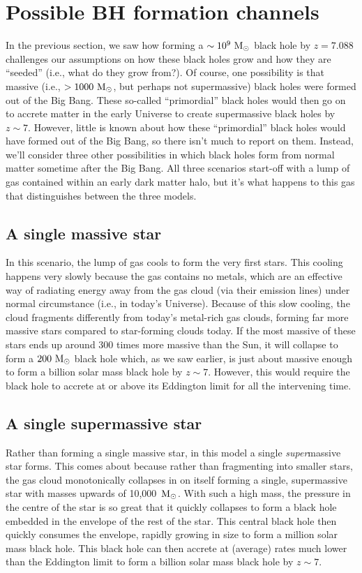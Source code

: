 \documentclass[11pt]{article}
\begin{document}
\section{Possible BH formation channels}
In the previous section, we saw how forming a $\sim10^9~{\rm M_\odot}$
black hole by $z=7.088$ challenges our assumptions on how these black
holes grow and how they are ``seeded'' (i.e., what do they grow
from?). Of course, one possibility is that massive (i.e.,
$>1000~{\rm M_\odot}$, but perhaps not supermassive) black holes were
formed out of the Big Bang. These so-called ``primordial'' black holes
would then go on to accrete matter in the early Universe to create
supermassive black holes by $z\sim7$. However, little is known about
how these ``primordial'' black holes would have formed out of the Big
Bang, so there isn't much to report on them. Instead, we'll consider
three other possibilities in which black holes form from normal matter
sometime after the Big Bang. All three scenarios start-off with a
lump of gas contained within an early dark matter halo, but it's what
happens to this gas that distinguishes between the three models.

\subsection{A single massive star}
In this scenario, the lump of gas cools to form the very first
stars. This cooling happens very slowly because the gas contains no
metals, which are an effective way of radiating energy away from the
gas cloud (via their emission lines) under normal circumstance (i.e.,
in today's Universe). Because of this slow cooling, the cloud
fragments differently from today's metal-rich gas clouds, forming far
more massive stars compared to star-forming clouds today. If the most
massive of these stars ends up around 300 times more massive than the
Sun, it will collapse to form a $200~{\rm M_\odot}$ black hole which,
as we saw earlier, is just about massive enough to form a billion
solar mass black hole by $z\sim7$. However, this would require the
black hole to accrete at or above its Eddington limit for all the
intervening time.

\subsection{A single supermassive star}
Rather than forming a single massive star, in this model a single {\it
  super}massive star forms. This comes about because rather than
fragmenting into smaller stars, the gas cloud monotonically collapses
in on itself forming a single, supermassive star with masses upwards
of 10,000~${\rm M_\odot}$. With such a high mass, the pressure in the
centre of the star is so great that it quickly collapses to form a
black hole embedded in the envelope of the rest of the star. This
central black hole then quickly consumes the envelope, rapidly growing
in size to form a million solar mass black hole. This black hole can
then accrete at (average) rates much lower than the Eddington limit to
form a billion solar mass black hole by $z\sim7$.
\end{document}
